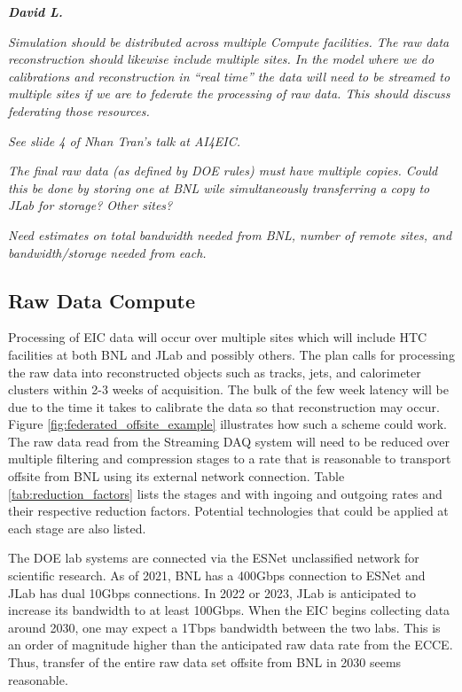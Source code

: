 \textbf{\emph{David L.}}

\emph{Simulation should be distributed across multiple Compute facilities. The raw data reconstruction should likewise include multiple sites. In the model where we do calibrations and reconstruction in ``real time'' the data will need to be streamed to multiple sites if we are to federate the processing of raw data. This should discuss federating those resources.}

\emph{See slide 4 of Nhan Tran's talk at AI4EIC.}

\emph{The final raw data (as defined by DOE rules) must have multiple copies. Could this be done by storing one at BNL wile simultaneously transferring a copy to JLab for storage? Other sites?}

\emph{Need estimates on total bandwidth needed from BNL, number of remote sites, and bandwidth/storage needed from each.}

\subsection{Raw Data Compute}
Processing of EIC data will occur over multiple sites which will include HTC facilities at both BNL and JLab and possibly others. The plan calls for processing the raw data into reconstructed objects such as tracks, jets, and calorimeter clusters within 2-3 weeks of acquisition. The bulk of the few week latency will be due to the time it takes to calibrate the data so that reconstruction may occur. Figure \ref{fig:federated_offsite_example} illustrates how such a scheme could work. The raw data read from the Streaming DAQ system will need to be reduced over multiple filtering and compression stages to a rate that is reasonable to transport offsite from BNL using its external network connection. Table \ref{tab:reduction_factors} lists the stages and with ingoing and outgoing rates and their respective reduction factors. Potential technologies that could be applied at each stage are also listed.

The DOE lab systems are connected via the ESNet unclassified network for scientific research\cite{ESNet}. As of 2021, BNL has a 400Gbps connection to ESNet and JLab has dual 10Gbps connections. In 2022 or 2023, JLab is anticipated to increase its bandwidth to at least 100Gbps. When the EIC begins collecting data around 2030, one may expect a 1Tbps bandwidth between the two labs. This is an order of magnitude higher than the anticipated raw data rate from the ECCE. Thus, transfer of the entire raw data set offsite from BNL in 2030 seems reasonable.


